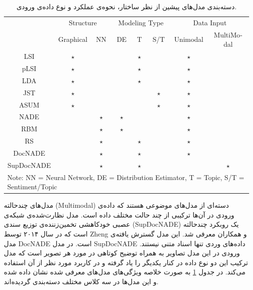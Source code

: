\documentclass[12pt,a4paper]{article}
\begin{document}
\begin{table}[!t]
	\footnotesize
	\centering
	\begin{latin}
		\begin{tabular}{|||c|||c|c|||c|c|c|||c|c|||}
			\hline
			& \multicolumn{2}{|c|||}{Structure} & \multicolumn{3}{|c|||}{Modeling Type} & \multicolumn{2}{|c|||}{Data Input}\\
			& \cellcolor{lightgray} Graphical & \cellcolor{lightgray} NN & \cellcolor{red} DE & \cellcolor{red} T & \cellcolor{red} S/T & \cellcolor{blue} Unimodal & \cellcolor{blue} MultiModal \\ \hline
			LSI     & $\star$   &            &			  &$\star$&            & $\star$  &  			\\ \hline
			pLSI    & $\star$   &            &			  &$\star$&            & $\star$  &  			\\ \hline
			LDA     & $\star$   &            &			  &$\star$&            & $\star$  &  			\\ \hline
			JST     & $\star$   &            &			  &       & $\star$    & $\star$  &  			\\ \hline
			ASUM    & $\star$   &            &			  &       & $\star$    & $\star$  &  			\\ \hline
			NADE    &           & $\star$    &    $\star$  &       &            & $\star$  &  			\\ \hline
			RBM     &           & $\star$    &    $\star$  &       &            & $\star$  & 			\\ \hline
			RS     &           & $\star$    &			  &$\star$&            & $\star$  &  			\\ \hline
			DocNADE   &           & $\star$    &			  &$\star$&            & $\star$  &  			\\ \hline
			SupDocNADE &           & $\star$    &			  &$\star$&            &          &  $\star$    \\ \hline
			\multicolumn{8}{|||l|||}{{\scriptsize Note: NN = Neural Network, DE = Distribution Estimator, T = Topic, S/T = Sentiment/Topic}} \\ \hline
		\end{tabular}
	\end{latin}
	\caption{دسته‌بندی مدل‌های پیشین از نظر ساختار، نحوه‌ی عملکرد و نوع داده‌ی ورودی.}
	\label{tabel3-1}
\end{table}

مدل‌های چندحالته (Multimodal) دسته‌ای از مدل‌های موضوعی هستند که داده‌ی ورودی در آن‌ها ترکیبی‌ از چند حالت مختلف داده است. مدل نظارت‌شده‌ی شبکه‌‌ی عصبی خودکاهشی تخمین‌زننده‌ی توزیع سندی (SupDocNADE) یک روبکرد چندحالته است که در سال ۲۰۱۴ توسط Zheng و همکاران
معرفی‌ شد. این مدل گسترش یافته‌ی مدل DocNADE است. در مدل SupDocNADE داده‌های وردی تنها اسناد متنی نیستند. ورودی در این مدل تصاویر به همراه توضیح کوتاهی‌ در مورد هر تصویر است که مدل ترکیب این دو نوع داده در کنار یکدیگر را یاد گرفته و در کاربرد مورد نظر از آن استفاده می‌کند. در جدول 
\ref{tabel3-1}
به صورت خلاصه ویژگی‌های مدل‌های معرفی شده نشان داده شده و این مدل‌ها در سه‌ کلاس مختلف دسته‌بندی گردیده‌اند. 
\end{document}
